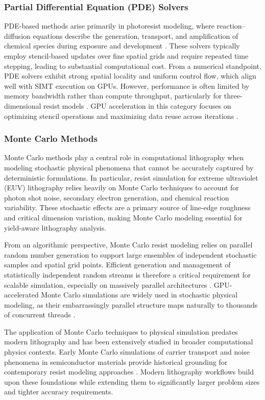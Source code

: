 \documentclass[pdflatex,sn-mathphys-num]{sn-jnl}%
\theoremstyle{thmstyleone}%
\theoremstyle{thmstyletwo}%
\theoremstyle{thmstylethree}%
\begin{document}
\subsubsection{Partial Differential Equation (PDE) Solvers}
PDE-based methods arise primarily in photoresist modeling, where reaction–diffusion equations describe the generation, transport, and amplification of chemical species during exposure and development \cite{NEUREUTHER1992377}. These solvers typically employ stencil-based updates over fine spatial grids and require repeated time stepping, leading to substantial computational cost. From a numerical standpoint, PDE solvers exhibit strong spatial locality and uniform control flow, which align well with SIMT execution on GPUs. However, performance is often limited by memory bandwidth rather than compute throughput, particularly for three-dimensional resist models \cite{Mack2007FundamentalPO}. GPU acceleration in this category focuses on optimizing stencil operations and maximizing data reuse across iterations \cite{yang2024gpuacceleratedinverselithographyhigh}.

\subsubsection{Monte Carlo Methods}
Monte Carlo methods play a central role in computational lithography when modeling stochastic physical phenomena that cannot be accurately captured by deterministic formulations. In particular, resist simulation for extreme ultraviolet (EUV) lithography relies heavily on Monte Carlo techniques to account for photon shot noise, secondary electron generation, and chemical reaction variability. These stochastic effects are a primary source of line-edge roughness and critical dimension variation, making Monte Carlo modeling essential for yield-aware lithography analysis.

From an algorithmic perspective, Monte Carlo resist modeling relies on parallel random number generation to support large ensembles of independent stochastic samples and spatial grid points. Efficient generation and management of statistically independent random streams is therefore a critical requirement for scalable simulation, especially on massively parallel architectures \cite{LEcuyer2015}. GPU-accelerated Monte Carlo simulations are widely used in stochastic physical modeling, as their embarrassingly parallel structure maps naturally to thousands of concurrent threads \cite{Sakane2022}.

The application of Monte Carlo techniques to physical simulation predates modern lithography and has been extensively studied in broader computational physics contexts. Early Monte Carlo simulations of carrier transport and noise phenomena in semiconductor materials provide historical grounding for contemporary resist modeling approaches \cite{Gruzinskis2008}. Modern lithography workflows build upon these foundations while extending them to significantly larger problem sizes and tighter accuracy requirements.
\end{document}
